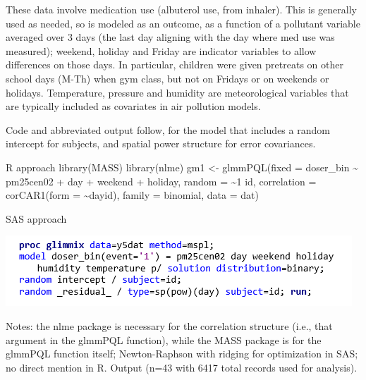 \documentclass[
  9pt,
  ignorenonframetext,
]{beamer}
\begin{document}
\begin{frame}{}
\protect\hypertarget{section-7}{}
These data involve medication use (albuterol use, from inhaler). This is
generally used as needed, so is modeled as an outcome, as a function of
a pollutant variable averaged over 3 days (the last day aligning with
the day where med use was measured); weekend, holiday and Friday are
indicator variables to allow differences on those days. In particular,
children were given pretreats on other school days (M-Th) when gym
class, but not on Fridays or on weekends or holidays. Temperature,
pressure and humidity are meteorological variables that are typically
included as covariates in air pollution models.

Code and abbreviated output follow, for the model that includes a random
intercept for subjects, and spatial power structure for error
covariances.
\end{frame}

\begin{frame}{}
\protect\hypertarget{section-8}{}
\begin{block}{R approach}
\protect\hypertarget{r-approach}{}
library(MASS) library(nlme) gm1 \textless- glmmPQL(fixed = doser\_bin
\textasciitilde{} pm25cen02 + day + weekend + holiday, random =
\textasciitilde1 \textbar{} id, correlation = corCAR1(form =
\textasciitilde day\textbar id), family = binomial, data = dat)
\end{block}

\begin{block}{SAS approach}
\protect\hypertarget{sas-approach}{}
\begin{center}\includegraphics[width=0.7\linewidth]{figs_L16/f7} \end{center}

Notes: the nlme package is necessary for the correlation structure
(i.e., that argument in the glmmPQL function), while the MASS package is
for the glmmPQL function itself; Newton-Raphson with ridging for
optimization in SAS; no direct mention in R. Output (n=43 with 6417
total records used for analysis).
\end{block}
\end{frame}
\end{document}
